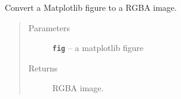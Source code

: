\documentclass[letterpaper,10pt,english]{sphinxmanual}
\begin{document}

\begin{fulllineitems}
\label{RRtoolbox.lib:RRtoolbox.lib.image.fig2bgra}
Convert a Matplotlib figure to a RGBA image.
\begin{quote}\begin{description}
\item[{Parameters}] \leavevmode
\textbf{\texttt{fig}} -- a matplotlib figure

\item[{Returns}] \leavevmode
RGBA image.

\end{description}\end{quote}

\end{fulllineitems}

\end{document}
